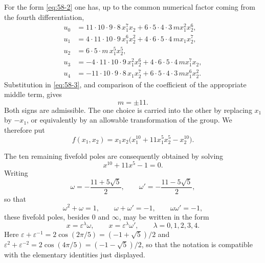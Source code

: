 \documentclass[11pt,a4paper]{article}
\newcommand{\eps}{\varepsilon}
\begin{document}
For the form \eqref{eq:58-2} one has, up to the common numerical factor coming from the fourth differentiation,
\begin{align*}
 u_0&=11\cdot10\cdot9\cdot8\,x_1^7x_2+6\cdot5\cdot4\cdot3\,m x_1^2x_2^6,\\
 u_1&=4\cdot11\cdot10\cdot9\,x_1^6x_2^2+4\cdot6\cdot5\cdot4\,m x_1x_2^7,\\
 u_2&=6\cdot5\cdot m\,x_1^5x_2^5,\\
 u_3&=-4\cdot11\cdot10\cdot9\,x_1^2x_2^6+4\cdot6\cdot5\cdot4\,m x_1^7x_2,\\
 u_4&=-11\cdot10\cdot9\cdot8\,x_1x_2^7+6\cdot5\cdot4\cdot3\,m x_1^6x_2^2.
\end{align*}
Substitution in \eqref{eq:58-3}, and comparison of the coefficient of the appropriate middle term, gives
\[
 m=\pm 11.
\]
Both signs are admissible.  The one choice is carried into the other by replacing \(x_1\) by \(-x_1\), or equivalently by an allowable transformation of the group.  We therefore put
\begin{equation}\label{eq:58-4}
 f(x_1,x_2)=x_1x_2\bigl(x_1^{10}+11x_1^5x_2^5-x_2^{10}\bigr).
\end{equation}

The ten remaining fivefold poles are consequently obtained by solving
\[
 x^{10}+11x^5-1=0.
\]
Writing
\begin{equation}\label{eq:58-5}
 \omega=-\frac{11+5\sqrt5}{2}, \qquad
 \omega'=-\frac{11-5\sqrt5}{2},
\end{equation}
so that
\begin{equation}\label{eq:58-6}
 \omega^2+\omega=1,
 \qquad \omega+\omega'=-1,
 \qquad \omega\omega'=-1,
\end{equation}
these fivefold poles, besides \(0\) and \(\infty\), may be written in the form
\begin{equation}\label{eq:58-7}
 x=\eps^\lambda\omega,
 \qquad
 x=\eps^\lambda\omega',
 \qquad \lambda=0,1,2,3,4.
\end{equation}
Here \(\eps+\eps^{-1}=2\cos(2\pi/5)=(-1+\sqrt5)/2\) and \(\eps^2+\eps^{-2}=2\cos(4\pi/5)=(-1-\sqrt5)/2\), so that the notation is compatible with the elementary identities just displayed.
\end{document}
